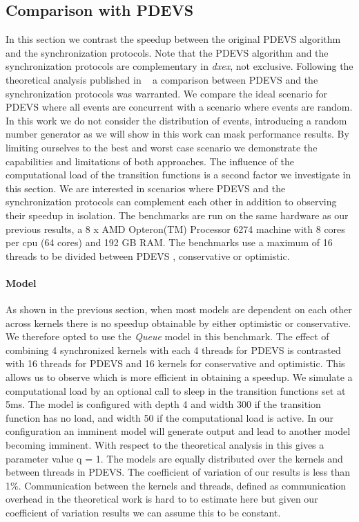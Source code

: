 \subsection{Comparison with PDEVS}
In this section we contrast the speedup between the original PDEVS algorithm and the synchronization protocols. 
Note that the PDEVS algorithm and the synchronization protocols are complementary in \textit{dxex}, not exclusive. 
Following the theoretical analysis published in ~\cite{amdahlpdevs} a comparison between PDEVS and the synchronization protocols was warranted. 
We compare the ideal scenario for PDEVS where all events are concurrent with a scenario where events are random.
In this work we do not consider the distribution of events, introducing a random number generator as we will show in this work can mask performance results. 
By limiting ourselves to the best and worst case scenario we demonstrate the capabilities and limitations of both approaches.
The influence of the computational load of the transition functions is a second factor we investigate in this section.
We are interested in scenarios where PDEVS and the synchronization protocols can complement each other in addition to observing their speedup in isolation.
The benchmarks are run on the same hardware as our previous results, a 8 x AMD Opteron(TM) Processor 6274 machine with 8 cores per cpu (64 cores) and 192 GB RAM. 
The benchmarks use a maximum of 16 threads to be divided between PDEVS , conservative or optimistic. 

\paragraph{Model}
As shown in the previous section, when most models are dependent on each other across kernels there is no speedup obtainable by either optimistic or conservative. 
We therefore opted to use the \textit{Queue} model in this benchmark.
The effect of combining 4 synchronized kernels with each 4 threads for PDEVS is contrasted with 16 threads for PDEVS and 16 kernels for conservative and optimistic.  
This allows us to observe which is more efficient in obtaining a speedup.
We simulate a computational load by an optional call to sleep in the transition functions set at 5ms. 
The model is configured with depth 4 and width 300 if the transition function has no load, and width 50 if the computational load is active.
In our configuration an imminent model will generate output and lead to another model becoming imminent. With respect to the 
theoretical analysis in \cite{amdahlpdevs} this gives a parameter value q = 1. 
The models are equally distributed over the kernels and between threads in PDEVS. 
The coefficient of variation of our results is less than 1\%. 
Communication between the kernels and threads, defined as communication overhead in the theoretical work is hard to to estimate here but given our coefficient of variation results we can assume this to be constant.

